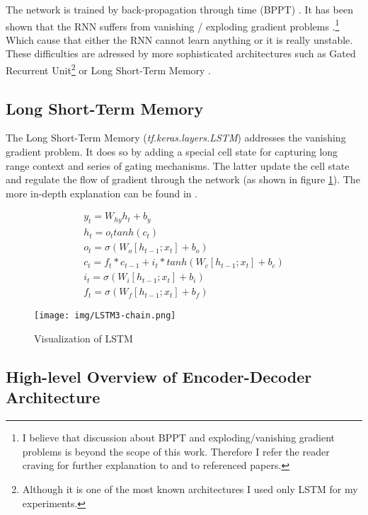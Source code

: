 The network is trained by back-propagation through time (BPPT) \citep{bpptWerbos1990}. It has been shown that the RNN suffers from vanishing / exploding gradient problems \citep{hochreiter1997}.\footnote{I believe that discussion about BPPT and exploding/vanishing gradient problems is beyond the scope of this work. Therefore I refer the reader craving for further explanation to \citep{Goodfellow-et-al-2016} and to referenced papers.} Which cause that either the RNN cannot learn anything or it is really unstable. These difficulties are adressed by more sophisticated architectures such as Gated Recurrent Unit\footnote{Although it is one of the most known architectures I used only LSTM for my experiments. } \citep{cho2014learning} or Long Short-Term Memory \citep{hochreiter1997}.


\subsection{Long Short-Term Memory}

The Long Short-Term Memory (\emph{tf.ke\-ras.lay\-ers.LSTM}) addresses the vanishing gradient problem. It does so by adding a special cell state for capturing long range context and series of gating mechanisms. The latter update the cell state and regulate the flow of gradient through the network (as shown in figure \ref{lstm}). The more in-depth explanation can be found in \citep{Olah2015}.

\begin{figure}[!ht]
    \begin{gather}
        y_t = W_{hy}h_t + b_y \\
        h_t = o_t tanh(c_t) \\
        o_t = \sigma(W_o[h_{t-1};x_t] + b_o) \\
        c_t = f_t * c_{t-1} + i_t * tanh(W_c[h_{t-1}; x_t] + b_c)\\
        i_t = \sigma(W_i[h_{t-1}; x_t] + b_i)\\
        f_t = \sigma(W_f[h_{t-1}; x_t] + b_f)
    \end{gather}
\end{figure}
\begin{figure}[!ht]
    \centering
    \texttt{[image: img/LSTM3-chain.png]}
    \caption{Visualization of LSTM \citep{Olah2015}} \label{lstm}
\end{figure}

\subsection{High-level Overview of Encoder-Decoder Architecture} \label{subsection:high_level_encoder_decoder}

